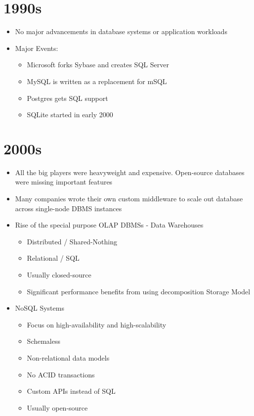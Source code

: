 \documentclass[11pt]{article}
\begin{document}
\section{1990s}
\begin{itemize}
    \item No major advancements in database systems or application workloads
    \item Major Events:
    \begin{itemize}
        \item Microsoft forks Sybase and creates SQL Server
        \item MySQL is written as a replacement for mSQL
        \item Postgres gets SQL support
        \item SQLite started in early 2000
    \end{itemize}
\end{itemize}

\section{2000s}
\begin{itemize}
    \item All the big players were heavyweight and expensive. Open-source databases were missing important features
    \item Many companies wrote their own custom middleware to scale out database across single-node DBMS instances
    \item Rise of the special purpose OLAP DBMSs - Data Warehouses
    \begin{itemize}
        \item Distributed / Shared-Nothing
        \item Relational / SQL
        \item Usually closed-source
        \item Significant performance benefits from using decomposition Storage Model
    \end{itemize}
    \item NoSQL Systems
    \begin{itemize}
        \item Focus on high-availability and high-scalability
        \item Schemaless
        \item Non-relational data models
        \item No ACID transactions
        \item Custom APIs instead of SQL
        \item Usually open-source
    \end{itemize}
\end{itemize}
\end{document}
